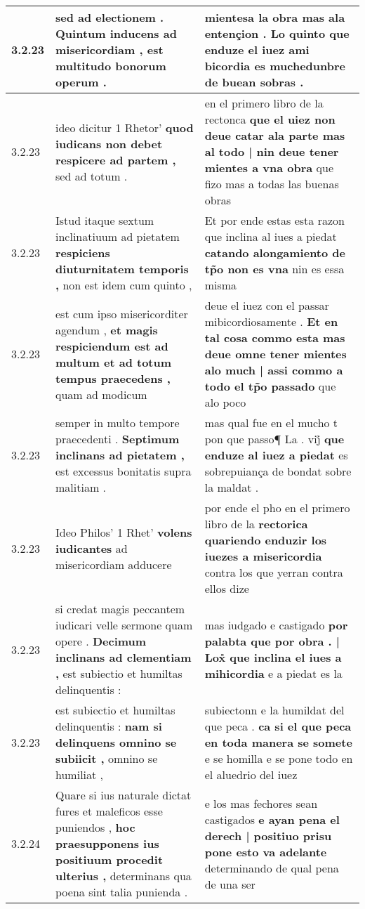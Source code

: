 \begin{tabular}{|p{1cm}|p{6.5cm}|p{6.5cm}|}
3.2.23 & sed ad electionem . \textbf{ Quintum inducens ad misericordiam , } est multitudo bonorum operum . & mientesa la obra mas ala entençion . \textbf{ Lo quinto que enduze el iuez ami bicordia } es muchedunbre de buean sobras . \\\hline
3.2.23 & ideo dicitur 1 Rhetor’ \textbf{ quod iudicans non debet respicere ad partem , } sed ad totum . & en el primero libro de la rectonca \textbf{ que el uiez non deue catar ala parte mas al todo | nin deue tener mientes a vna obra } que fizo mas a todas las buenas obras \\\hline
3.2.23 & Istud itaque sextum inclinatiuum ad pietatem \textbf{ respiciens diuturnitatem temporis , } non est idem cum quinto , & Et por ende estas esta razon que inclina al iues a piedat \textbf{ catando alongamiento de tp̃o non es vna } nin es essa misma \\\hline
3.2.23 & est cum ipso misericorditer agendum , \textbf{ et magis respiciendum est ad multum et ad totum tempus praecedens , } quam ad modicum & deue el iuez con el passar mibicordiosamente . \textbf{ Et en tal cosa commo esta mas deue omne tener mientes alo much | assi commo a todo el tp̃o passado } que alo poco \\\hline
3.2.23 & semper in multo tempore praecedenti . \textbf{ Septimum inclinans ad pietatem , } est excessus bonitatis supra malitiam . & mas qual fue en el mucho t pon que passo¶ La . vij̊ \textbf{ que enduze al iuez a piedat } es sobrepuiança de bondat sobre la maldat . \\\hline
3.2.23 & Ideo Philos’ 1 Rhet’ \textbf{ volens iudicantes } ad misericordiam adducere & por ende el pho en el primero libro de la \textbf{ rectorica quariendo enduzir los iuezes a misericordia } contra los que yerran contra ellos dize \\\hline
3.2.23 & si credat magis peccantem iudicari velle sermone quam opere . \textbf{ Decimum inclinans ad clementiam , } est subiectio et humiltas delinquentis : & mas iudgado e castigado \textbf{ por palabta que por obra . | Lox̊ que inclina el iues a mihicordia } e a piedat es la \\\hline
3.2.23 & est subiectio et humiltas delinquentis : \textbf{ nam si delinquens omnino se subiicit , } omnino se humiliat , & subiectonn e la humildat del que peca . \textbf{ ca si el que peca en toda manera se somete } e se homilla e se pone todo en el aluedrio del iuez \\\hline
3.2.24 & Quare si ius naturale dictat fures et maleficos esse puniendos , \textbf{ hoc praesupponens ius positiuum procedit ulterius , } determinans qua poena sint talia punienda . & e los mas fechores sean castigados \textbf{ e ayan pena el derech | positiuo prisu pone esto va adelante } determinando de qual pena de una ser \\\hline

\end{tabular}
